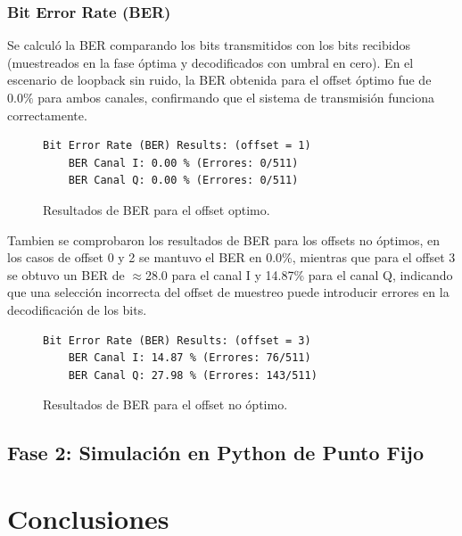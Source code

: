 \documentclass[11pt,a4paper]{article}
\begin{document}
\subsubsection{Bit Error Rate (BER)}

Se calculó la BER comparando los bits transmitidos con los bits recibidos
(muestreados en la fase óptima y decodificados con umbral en cero). En el
escenario de loopback sin ruido, la BER obtenida para el offset óptimo fue de
$0.0 \%$ para ambos canales, confirmando que el sistema de transmisión funciona
correctamente.

\begin{figure}[H]
    \centering
    \begin{lstlisting}[frame=single, basicstyle=\scriptsize\ttfamily]
    Bit Error Rate (BER) Results: (offset = 1)
    BER Canal I: 0.00 % (Errores: 0/511)
    BER Canal Q: 0.00 % (Errores: 0/511)
\end{lstlisting}
    \caption{Resultados de BER para el offset optimo.}
\end{figure}

Tambien se comprobaron los resultados de BER para los offsets no óptimos, en
los casos de offset 0 y 2 se mantuvo el BER en 0.0\%, mientras que para el
offset 3 se obtuvo un BER de $\approx$28.0 para el canal I y 14.87\% para el
canal Q, indicando que una selección incorrecta del offset de muestreo puede
introducir errores en la decodificación de los bits.

\begin{figure}[H]
    \centering
    \begin{lstlisting}[frame=single, basicstyle=\scriptsize\ttfamily]
    Bit Error Rate (BER) Results: (offset = 3)
    BER Canal I: 14.87 % (Errores: 76/511)
    BER Canal Q: 27.98 % (Errores: 143/511)
\end{lstlisting}
    \caption{Resultados de BER para el offset no óptimo.}
\end{figure}

\subsection{Fase 2: Simulación en Python de Punto Fijo}

\section{Conclusiones}
\end{document}
